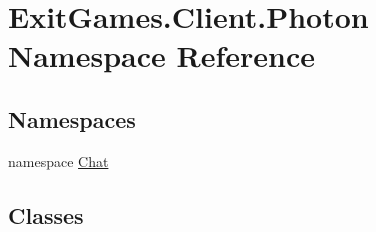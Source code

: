 \hypertarget{namespace_exit_games_1_1_client_1_1_photon}{}\section{Exit\+Games.\+Client.\+Photon Namespace Reference}
\label{namespace_exit_games_1_1_client_1_1_photon}
\subsection*{Namespaces}
\begin{DoxyCompactItemize}
\item 
namespace \hyperlink{namespace_exit_games_1_1_client_1_1_photon_1_1_chat}{Chat}
\end{DoxyCompactItemize}
\subsection*{Classes}
